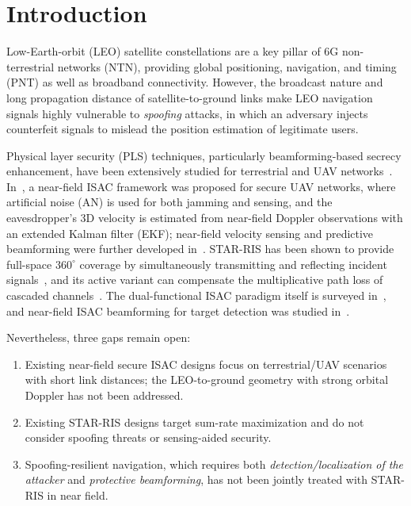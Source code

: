 \section{Introduction}\label{sec:intro}

Low-Earth-orbit (LEO) satellite constellations are a key pillar of 6G non-terrestrial networks (NTN), providing global positioning, navigation, and timing (PNT) as well as broadband connectivity. However, the broadcast nature and long propagation distance of satellite-to-ground links make LEO navigation signals highly vulnerable to \emph{spoofing} attacks, in which an adversary injects counterfeit signals to mislead the position estimation of legitimate users.

Physical layer security (PLS) techniques, particularly beamforming-based secrecy enhancement, have been extensively studied for terrestrial and UAV networks~\cite{zeng2016uav,wu2020ris}. In~\cite{zhao2025nearfield}, a near-field ISAC framework was proposed for secure UAV networks, where artificial noise (AN) is used for both jamming and sensing, and the eavesdropper's 3D velocity is estimated from near-field Doppler observations with an extended Kalman filter (EKF); near-field velocity sensing and predictive beamforming were further developed in~\cite{wang2025velocity}. STAR-RIS has been shown to provide full-space $360^\circ$ coverage by simultaneously transmitting and reflecting incident signals~\cite{zhao2022starris,mu2022starris,xu2021starris}, and its active variant can compensate the multiplicative path loss of cascaded channels~\cite{zhao2025aerial,zhang2023activeris}. The dual-functional ISAC paradigm itself is surveyed in~\cite{liu2022isac}, and near-field ISAC beamforming for target detection was studied in~\cite{galappaththige2024nearfield,cao2024nearfield}.

Nevertheless, three gaps remain open:
\begin{enumerate}[leftmargin=1.5em]
    \item Existing near-field secure ISAC designs focus on terrestrial/UAV scenarios with short link distances; the LEO-to-ground geometry with strong orbital Doppler has not been addressed.
    \item Existing STAR-RIS designs target sum-rate maximization and do not consider spoofing threats or sensing-aided security.
    \item Spoofing-resilient navigation, which requires both \emph{detection/localization of the attacker} and \emph{protective beamforming}, has not been jointly treated with STAR-RIS in near field.
\end{enumerate}

